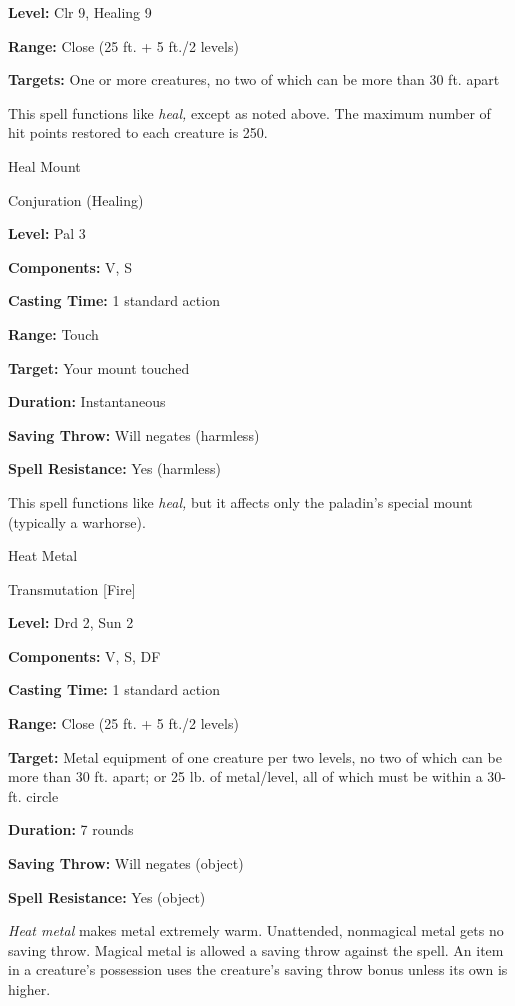 \documentclass{article}
\begin{document}
\textbf{Level:} Clr 9, Healing 9

\textbf{Range:} Close (25 ft. + 5 ft./2 levels)

\textbf{Targets:} One or more creatures, no two of which can be more than 30 ft. 
apart

This spell functions like \textit{heal, }except as noted above. The maximum number 
of hit points restored to each creature is 250.

\vspace{12pt}
Heal Mount

Conjuration (Healing)

\textbf{Level:} Pal 3

\textbf{Components:} V, S

\textbf{Casting Time:} 1 standard action

\textbf{Range:} Touch

\textbf{Target:} Your mount touched

\textbf{Duration:} Instantaneous

\textbf{Saving Throw: }Will negates (harmless)

\textbf{Spell Resistance:} Yes (harmless)

This spell functions like \textit{heal, }but it affects only the paladin's special 
mount (typically a warhorse).

\vspace{12pt}
Heat Metal

Transmutation [Fire]

\textbf{Level:} Drd 2, Sun 2

\textbf{Components:} V, S, DF

\textbf{Casting Time:} 1 standard action

\textbf{Range:} Close (25 ft. + 5 ft./2 levels)

\textbf{Target: }Metal equipment of one creature per two levels, no two of which 
can be more than 30 ft. apart; or 25 lb. of metal/level, all of which must be within 
a 30-ft. circle

\textbf{Duration:} 7 rounds

\textbf{Saving Throw: }Will negates (object)

\textbf{Spell Resistance:} Yes (object)

\textit{Heat metal }makes metal extremely warm. Unattended, nonmagical metal gets 
no saving throw. Magical metal is allowed a saving throw against the spell. An 
item in a creature's possession uses the creature's saving throw bonus unless its 
own is higher.
\end{document}
